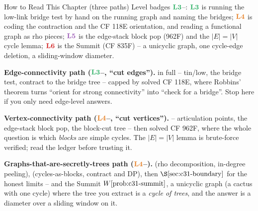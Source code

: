 \begin{chaptertheorybox}{How to Read This Chapter (three paths)}
Level badges \(\lv3\)--: \(\lv3\) is running the low-link bridge test by
hand on the running graph and naming the bridges; \(\lv4\) is coding the
contraction and the CF 118E orientation, and reading a functional graph as rho
pieces; \(\lv5\) is the edge-stack block pop (962F) and the \(|E|=|V|\) cycle
lemma; \(\lv6\) is the Summit (CF 835F) -- a unicyclic graph, one cycle-edge
deletion, a sliding-window diameter.

\textbf{Edge-connectivity path (\(\lv3\)--, ``cut edges'').}
 in full -- tin/low, the bridge test, contract to the bridge
tree -- capped by solved CF 118E, where Robbins' theorem turns ``orient for
strong connectivity'' into ``check for a bridge''.  Stop here if you only need
edge-level answers.

\textbf{Vertex-connectivity path (\(\lv4\)--, ``cut vertices'').}
 -- articulation points, the edge-stack block pop, the
block-cut tree -- then solved CF 962F, where the whole question is which
\emph{blocks} are simple cycles.  The \(|E|=|V|\) lemma is brute-force verified;
read the ledger before trusting it.

\textbf{Graphs-that-are-secretly-trees path (\(\lv4\)--).}
 (rho decomposition, in-degree peeling),
 (cycles-as-blocks, contract and DP), then
\(\secref{c31-boundary}\) for the honest limits -- and the Summit
\(\probref{c31-summit}\), a unicyclic graph (a cactus with one cycle) where the
tree you extract is a \emph{cycle of trees}, and the answer is a diameter over a
sliding window on it.
\end{chaptertheorybox}

